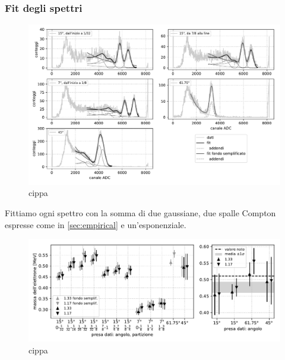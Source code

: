 \subsubsection{Fit degli spettri}

\begin{figure}
	\hspace{-8em}\includegraphics[height=0.9\textwidth]{fit}
	\caption{\label{fig:fit}
	cippa}
\end{figure}

Fittiamo ogni spettro con la somma di due gaussiane,
due spalle Compton espresse come in \autoref{sec:empirical}
e un'esponenziale.

\begin{figure}
	\hspace{-7em}\includegraphics[width=50em]{me}
	\caption{\label{fig:me}
	cippa}
\end{figure}
